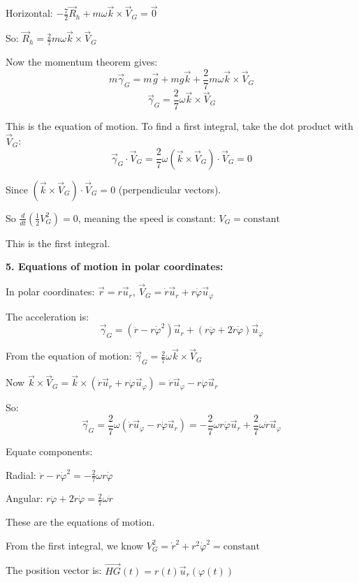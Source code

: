 \documentclass[12pt]{article}
\begin{document}
\begin{correctionbox}
Horizontal: $-\frac{7}{2}\vec{R}_h + m\omega\vec{k} \times \vec{V}_G = \vec{0}$

So: $\vec{R}_h = \frac{2}{7}m\omega\vec{k} \times \vec{V}_G$

Now the momentum theorem gives:
$$m\vec{\gamma}_G = m\vec{g} + mg\vec{k} + \frac{2}{7}m\omega\vec{k} \times \vec{V}_G$$
$$\vec{\gamma}_G = \frac{2}{7}\omega\vec{k} \times \vec{V}_G$$

This is the equation of motion. To find a first integral, take the dot product with $\vec{V}_G$:
$$\vec{\gamma}_G \cdot \vec{V}_G = \frac{2}{7}\omega(\vec{k} \times \vec{V}_G) \cdot \vec{V}_G = 0$$

Since $(\vec{k} \times \vec{V}_G) \cdot \vec{V}_G = 0$ (perpendicular vectors).

So $\frac{d}{dt}(\frac{1}{2}V_G^2) = 0$, meaning the speed is constant: $V_G = \text{constant}$

This is the first integral.

\textbf{5. Equations of motion in polar coordinates:}

In polar coordinates: $\vec{r} = r\vec{u}_r$, $\vec{V}_G = \dot{r}\vec{u}_r + r\dot{\varphi}\vec{u}_\varphi$

The acceleration is:
$$\vec{\gamma}_G = (\ddot{r} - r\dot{\varphi}^2)\vec{u}_r + (r\ddot{\varphi} + 2\dot{r}\dot{\varphi})\vec{u}_\varphi$$

From the equation of motion: $\vec{\gamma}_G = \frac{2}{7}\omega\vec{k} \times \vec{V}_G$

Now $\vec{k} \times \vec{V}_G = \vec{k} \times (\dot{r}\vec{u}_r + r\dot{\varphi}\vec{u}_\varphi) = \dot{r}\vec{u}_\varphi - r\dot{\varphi}\vec{u}_r$

So:
$$\vec{\gamma}_G = \frac{2}{7}\omega(\dot{r}\vec{u}_\varphi - r\dot{\varphi}\vec{u}_r) = -\frac{2}{7}\omega r\dot{\varphi}\vec{u}_r + \frac{2}{7}\omega\dot{r}\vec{u}_\varphi$$

Equate components:

Radial: $\ddot{r} - r\dot{\varphi}^2 = -\frac{2}{7}\omega r\dot{\varphi}$

Angular: $r\ddot{\varphi} + 2\dot{r}\dot{\varphi} = \frac{2}{7}\omega\dot{r}$

These are the equations of motion.

From the first integral, we know $V_G^2 = \dot{r}^2 + r^2\dot{\varphi}^2 = \text{constant}$

The position vector is: $\overrightarrow{HG}(t) = r(t)\vec{u}_r(\varphi(t))$


\end{correctionbox}
\end{document}
